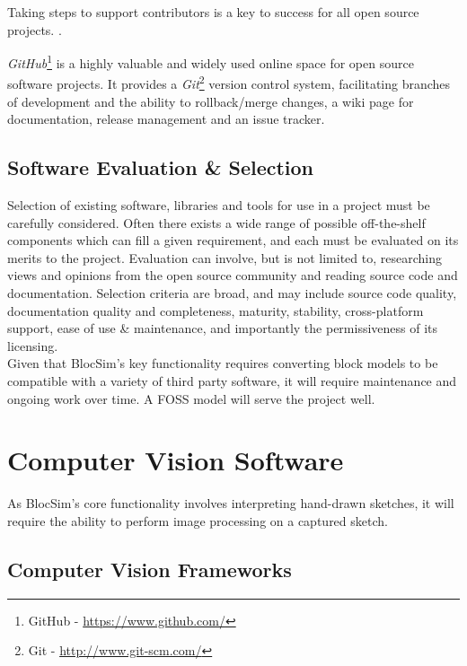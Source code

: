 Taking steps to support contributors is a key to success for all open source projects. \cite{openSource2}. 

\textit{GitHub}\footnote{GitHub - \url{https://www.github.com/}} is a highly valuable and widely used online space for open source software projects. It provides a \textit{Git}\footnote{Git - \url{http://www.git-scm.com/}} version control system, facilitating branches of development and the ability to rollback/merge changes, a wiki page for documentation, release management and an issue tracker.

\vspace{0.5 cm}

\subsection{Software Evaluation \& Selection}

Selection of existing software, libraries and tools for use in a project must be carefully considered. Often there exists a wide range of possible off-the-shelf components which can fill a given requirement, and each must be evaluated on its merits to the project. Evaluation can involve, but is not limited to, researching views and opinions from the open source community and reading source code and documentation. Selection criteria are broad, and may include source code quality, documentation quality and completeness, maturity, stability, cross-platform support, ease of use \& maintenance, and importantly the permissiveness of its licensing. \cite{openSource}
\\

Given that BlocSim's key functionality requires converting block models to be compatible with a variety of third party software, it will require maintenance and ongoing work over time. A FOSS model will serve the project well.



\section{Computer Vision Software}

As BlocSim's core functionality involves interpreting hand-drawn sketches, it will require the ability to perform image processing on a captured sketch.

\subsection{Computer Vision Frameworks}

